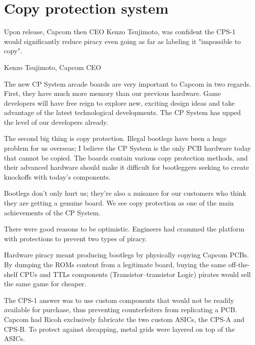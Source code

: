 

\section{Copy protection system}

Upon release, Capcom then CEO Kenzo Tsujimoto, was confident the CPS-1 would significantly reduce piracy even going as far as labeling it "impossible to copy".

\begin{q}{Kenzo Tsujimoto, Capcom CEO\cite{gamest38}}
    
The new CP System arcade boards are very important to Capcom in two regards. First, they have much more memory than our previous hardware. Game developers will have free reign to explore new, exciting design ideas and take advantage of the latest technological developments. The CP System has upped the level of our developers already.

The second big thing is copy protection. Illegal bootlegs have been a huge problem for us overseas; I believe the CP System is the only PCB hardware today that cannot be copied. The boards contain various copy protection methods, and their advanced hardware should make it difficult for bootleggers seeking to create knockoffs with today's components. 

Bootlegs don't only hurt us; they're also a nuisance for our customers who think they are getting a genuine board. We see copy protection as one of the main achievements of the CP System.
\end{q}


There were good reasons to be optimistic. Engineers had crammed the platform with protections to prevent two types of piracy.


Hardware piracy meant producing bootlegs by physically copying Capcom PCBs. By dumping the ROMs content from a legitimate board, buying the same off-the-shelf CPUs and TTLs components (Transistor–transistor Logic) pirates would sell the same game  for cheaper.

The CPS-1 answer was to use custom components that would not be readily available for purchase, thus preventing counterfeiters from replicating a PCB. Capcom had Ricoh exclusively fabricate the two custom ASICs, the CPS-A and CPS-B. To protect against decapping, metal grids were layered on top of the ASICs\cite{arcadeHackerCPS1Rev}. 


